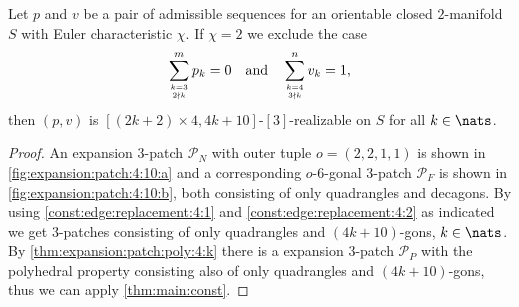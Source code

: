 \clearpage
\begin{theorem}
  Let $p$ and $v$ be a pair of admissible sequences for an orientable closed $2$-manifold $S$ with {\sc Euler} characteristic $\chi$. If $\chi = 2$ we exclude the case
  \begin{align*}
    \sum_{k=3 \atop 2 \nmid k}^{m} p_k = 0 \text{\quad and\quad}\sum_{k=4 \atop 3 \nmid k}^n v_k = 1,
  \end{align*}
  then $(p, v)$ is $[(2k + 2) \times 4, 4k+10]$-$[3]$-realizable on $S$ for all $k \in \nats$.
  \begin{proof}
    An expansion $3$-patch $\mathcal{P}_N$ with outer tuple $o = (2, 2, 1, 1)$ is shown in \autoref{fig:expansion:patch:4:10:a} and a corresponding $o$-$6$-gonal $3$-patch $\mathcal{P}_F$ is shown in \autoref{fig:expansion:patch:4:10:b}, both consisting of only quadrangles and decagons. By using \autoref{const:edge:replacement:4:1} and \autoref{const:edge:replacement:4:2} as indicated we get $3$-patches consisting of only quadrangles and $(4k+10)$-gons, $k \in \nats$. By \autoref{thm:expansion:patch:poly:4:k} there is a expansion $3$-patch $\mathcal{P}_P$ with the polyhedral property consisting also of only quadrangles and $(4k+10)$-gons, thus we can apply \autoref{thm:main:const}.%
  \end{proof}%
\end{theorem}%
